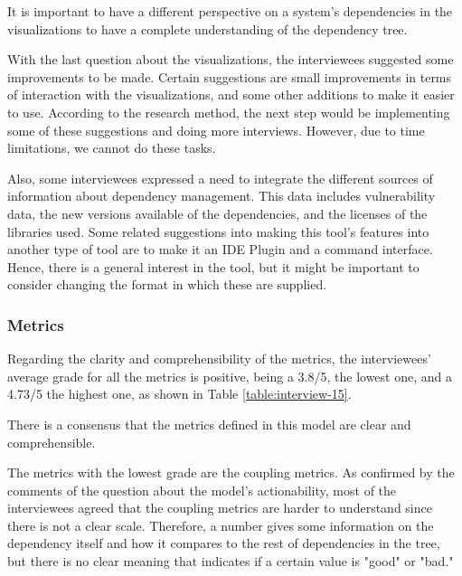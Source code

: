 \begin{finding}
	It is important to have a different perspective on a system's dependencies in the visualizations to have a complete understanding of the dependency tree.
	\label{find:different-perspectives}
\end{finding}

With the last question about the visualizations, the interviewees suggested some improvements to be made. Certain suggestions are small improvements in terms of interaction with the visualizations, and some other additions to make it easier to use. According to the research method, the next step would be implementing some of these suggestions and doing more interviews. However, due to time limitations, we cannot do these tasks.

Also, some interviewees expressed a need to integrate the different sources of information about dependency management. This data includes vulnerability data, the new versions available of the dependencies, and the licenses of the libraries used. Some related suggestions into making this tool's features into another type of tool are to make it an IDE Plugin and a command interface. Hence, there is a general interest in the tool, but it might be important to consider changing the format in which these are supplied.

\subsubsection{Metrics}
Regarding the clarity and comprehensibility of the metrics, the interviewees' average grade for all the metrics is positive, being a 3.8/5, the lowest one, and a 4.73/5 the highest one, as shown in Table \ref{table:interview-15}.

\begin{finding}
	There is a consensus that the metrics defined in this model are clear and comprehensible.
	\label{find:clear-comprehensible}
\end{finding}

The metrics with the lowest grade are the coupling metrics. As confirmed by the comments of the question about the model's actionability, most of the interviewees agreed that the coupling metrics are harder to understand since there is not a clear scale. Therefore, a number gives some information on the dependency itself and how it compares to the rest of dependencies in the tree, but there is no clear meaning that indicates if a certain value is "good" or "bad."

